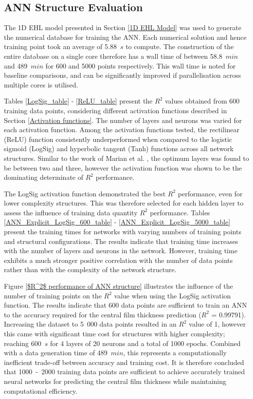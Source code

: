 \subsection{ANN Structure Evaluation} \label{ANN Structure Evaluation Results}

The 1D EHL model presented in Section \ref{1D EHL Model} was used to generate the numerical database for training the ANN. Each numerical solution and hence training point took an average of 5.88~$s$ to compute. The construction of the entire database on a single core therefore has a wall time of between 58.8~$min$ and 489~$min$ for 600 and 5000 points respectively. This wall time is noted for baseline comparisons, and can be significantly improved if parallelisation across multiple cores is utilised.

Tables \ref{LogSig_table} - \ref{ReLU_table} present the $R^2$ values obtained from 600 training data points, considering different activation functions described in Section \ref{Activation functions}. The number of layers and neurons was varied for each activation function. Among the activation functions tested, the rectilinear (ReLU) function consistently underperformed when compared to the logistic sigmoid (LogSig) and hyperbolic tangent (Tanh) functions across all network structures.  Similar to the work of Marian et al. \cite{Marian2021}, the optimum layers was found to be between two and three, however the activation function was shown to be the dominating determinate of $R^2$ performance.

The LogSig activation function demonstrated the best $R^2$ performance, even for lower complexity structures. This was therefore selected for each hidden layer to assess the influence of training data quantity $R^2$ performance. Tables \ref{ANN_Explicit_LogSig_600_table} - \ref{ANN_Explicit_LogSig_5000_table} present the training times for networks with varying numbers of training points and structural configurations. The results indicate that training time increases with the number of layers and neurons in the network. However, training time exhibits a much stronger positive correlation with the number of data points rather than with the complexity of the network structure.

Figure \ref{$R^2$ performance of ANN structure} illustrates the influence of the number of training points on the $R^2$ value when using the LogSig activation function. The results indicate that 600 data points are sufficient to train an ANN to the accuracy required for the central film thickness prediction ($R^2$ = 0.99791). Increasing the dataset to 5~000 data points resulted in an $R^2$ value of 1, however this came with significant time cost for structures with higher complexity; reaching 600~$s$ for 4 layers of 20 neurons and a total of 1000 epochs. Combined with a data generation time of 489~$min$, this represents a computationally inefficient trade-off between accuracy and training cost. It is therefore concluded that 1000~-~2000 training data points are sufficient to achieve accurately trained neural networks for predicting the central film thickness while maintaining computational efficiency.

